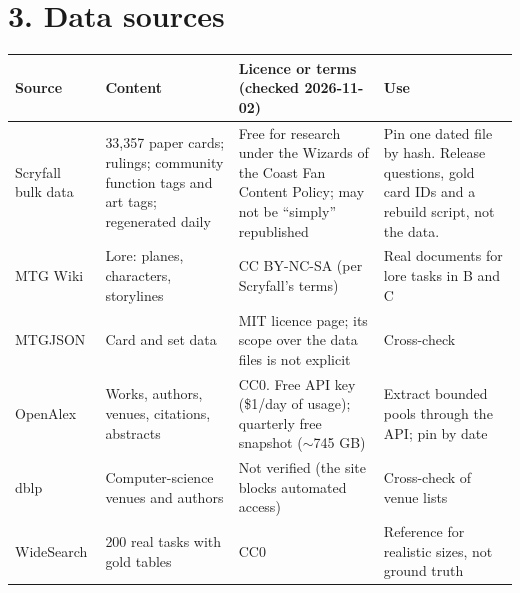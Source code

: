 \documentclass[10pt]{article}
\begin{document}
\section*{3. Data sources}
{\small
\begin{tabularx}{\linewidth}{@{}L{2.3cm}L{4.1cm}L{4.2cm}Y@{}}
\toprule
Source & Content & Licence or terms (checked 2026-11-02) & Use \\
\midrule
Scryfall bulk data & 33,357 paper cards; rulings; community function tags and art tags; regenerated daily &
Free for research under the Wizards of the Coast Fan Content Policy; may not be ``simply'' republished & Pin one
dated file by hash. Release questions, gold card IDs and a rebuild script, not the data. \\
MTG Wiki & Lore: planes, characters, storylines & CC BY-NC-SA (per Scryfall's terms) & Real documents for lore
tasks in B and C \\
MTGJSON & Card and set data & MIT licence page; its scope over the data files is not explicit & Cross-check \\
OpenAlex & Works, authors, venues, citations, abstracts & CC0. Free API key (\$1/day of usage); quarterly free
snapshot ($\sim$745 GB) & Extract bounded pools through the API; pin by date \\
dblp & Computer-science venues and authors & Not verified (the site blocks automated access) & Cross-check of
venue lists \\
WideSearch & 200 real tasks with gold tables & CC0 & Reference for realistic sizes, not ground truth \\
\bottomrule
\end{tabularx}}
\end{document}
